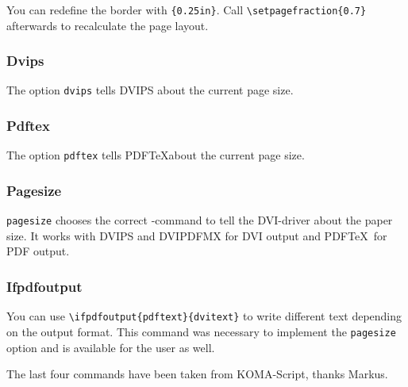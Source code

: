 You can redefine the border with 
\verb|{0.25in}|.
Call \verb|\setpagefraction{0.7}| afterwards to recalculate the page layout.

\subsubsection{Dvips}

The option \texttt{dvips} tells DVIPS about the current page size.

\subsubsection{Pdftex}

The option \texttt{pdftex} tells PDF\TeX about the current page size.

\subsubsection{Pagesize}

\texttt{pagesize} chooses the correct -command to tell the
DVI-driver about the paper size. It works with DVIPS and DVIPDFMX for DVI
output and PDF\TeX\ for PDF output.

\subsubsection{Ifpdfoutput}

You can use \verb|\ifpdfoutput{pdftext}{dvitext}| to write different text
depending on the output format. This command was necessary to implement the
\texttt{pagesize} option and is available for the user as well.

The last four commands have been taken from KOMA-Script, thanks Markus.

\endinput
